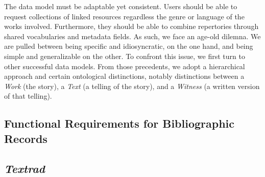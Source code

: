 The data model must be adaptable yet consistent. Users should be able to request collections of linked resources regardless the genre or language of the works involved. Furthermore, they should be able to combine repertories through shared vocabularies and metadata fields. As such, we face an age-old dilemna. We are pulled between being specific and idiosyncratic, on the one hand, and being simple and generalizable on the other. To confront this issue, we first turn to other successful data models. From those precedents, we adopt a hierarchical approach and certain ontological distinctions, notably distinctions between a \textit{Work} (the story), a \textit{Text} (a telling of the story), and a \textit{Witness} (a written version of that telling).

\subsection{Functional Requirements for Bibliographic Records}


% 

\subsection{\textit{Textrad}}


